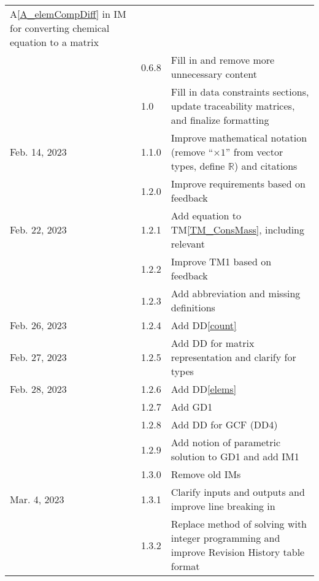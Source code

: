 \documentclass[12pt]{article}
\newcommand{\ddref}[1]{DD\ref{#1}}
\newcommand{\tmref}[1]{TM\ref{#1}}
\newcommand{\aref}[1]{A\ref{#1}}
\begin{document}
\begin{xltabular}{\textwidth}{llX}
  \aref{A_elemCompDiff} in IM for converting chemical equation to a matrix                                   \\
  & 0.6.8         & Fill in  and remove more unnecessary content  \\
  & 1.0           & Fill in data constraints sections, update traceability matrices, and
  finalize formatting                                                                                        \\
  Feb. 14, 2023       & 1.1.0         & Improve mathematical notation
  (remove ``$\times 1$'' from vector types, define $\mathbb{R}$) and citations                               \\
  & 1.2.0         & Improve requirements based on feedback                               \\
  Feb. 22, 2023       & 1.2.1         & Add equation to \tmref{TM_ConsMass}, including relevant
                                                                                      \\
  & 1.2.2         & Improve TM1 based on feedback                           \\
  & 1.2.3         & Add \progname{} abbreviation and missing definitions                 \\
  Feb. 26, 2023       & 1.2.4         & Add \ddref{count}                                                    \\
  Feb. 27, 2023       & 1.2.5         & Add DD for matrix representation and
  clarify  for types \\
  Feb. 28, 2023       & 1.2.6         & Add \ddref{elems}                                                    \\
  & 1.2.7         & Add GD1 \\
  & 1.2.8         & Add DD for GCF (DD4) \\
  & 1.2.9         & Add notion of parametric solution to GD1 and add IM1 \\
  & 1.3.0         & Remove old IMs                                                       \\
  Mar. 4, 2023        & 1.3.1         & Clarify inputs and outputs and
  improve line breaking in                                                               \\
  & 1.3.2         & Replace method of solving with integer programming and
  improve Revision History table format \\

\end{xltabular}
\end{document}
